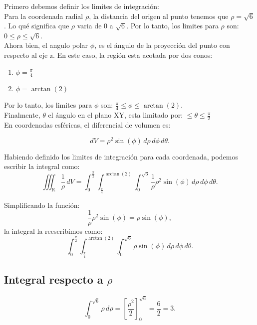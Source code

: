

	Primero debemos definir los limites de integración:\\
	
	Para la coordenada radial $\rho$, la distancia del origen al punto tenemos que \( \rho = \sqrt{6} \). Lo qué significa que $\rho$ varia de 0 a $\sqrt{6}$. Por lo tanto, los limites para $\rho$ son: $0\leq \rho \leq \sqrt{6}$.\\
	
	Ahora bien, el angulo polar $\phi$, es el ángulo de la proyección del punto con respecto al eje z. En este caso, la región esta acotada por dos conos:
	
	\begin{center}
	\begin{enumerate}
	\item $ \phi = \frac{\pi}{4}$
	\item $ \phi = \arctan(2)$
	\end{enumerate}
	\end{center}
	
	Por lo tanto, los limites para $\phi$ son: $\frac{\pi}{4} \leq \phi \leq \arctan(2)$.\\
	
	Finalmente, $\theta$ el ángulo en el plano XY, esta limitado por: $\leq \theta \leq \frac{\pi}{2}$\\
	
	En coordenadas esféricas, el diferencial de volumen es:
	
	\[
	dV = \rho^2 \sin(\phi) \, d\rho \, d\phi \, d\theta.
	\]
	
	Habiendo definido los limites de integración para cada coordenada, podemos escribir la integral como:
	\[
	\iiint_{\text{R}} \frac{1}{\rho} \, dV = \int_{0}^{\frac{\pi}{2}} \int_{\frac{\pi}{4}}^{\arctan(2)} \int_{0}^{\sqrt{6}} \frac{1}{\rho} \rho^2 \sin(\phi) \, d\rho \, d\phi \, d\theta.
	\]
	
	Simplificando la función:
	\[
	\frac{1}{\rho} \rho^2 \sin(\phi) = \rho \sin(\phi),
	\]
	la integral la reescribimos como:
	\[
	\int_{0}^{\frac{\pi}{2}} \int_{\frac{\pi}{4}}^{\arctan(2)} \int_{0}^{\sqrt{6}} \rho \sin(\phi) \, d\rho \, d\phi \, d\theta.
	\]
	
	
	\subsection*{Integral respecto a \( \rho \)}
	\[
	\int_{0}^{\sqrt{6}} \rho \, d\rho = \left[ \frac{\rho^2}{2} \right]_{0}^{\sqrt{6}} = \frac{6}{2} = 3.
	\]
	
